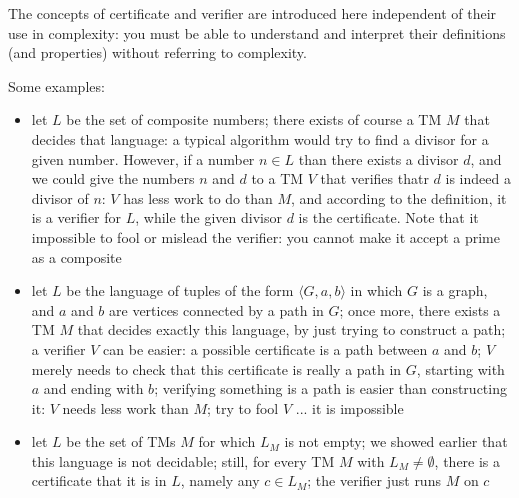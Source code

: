 The concepts of certificate and verifier are introduced here
independent of their use in complexity: you must be able to understand
and interpret their definitions (and properties) without referring to
complexity.



Some examples:
\begin{itemize}
\item 
let $L$ be the set of composite numbers; there exists of course a TM
$M$ that decides that language: a typical algorithm would try to find
a divisor for a given number. However, if a number $n \in L$ than
there exists a divisor $d$, and we could give the numbers $n$ and $d$
to a TM $V$ that verifies thatr $d$ is indeed a divisor of $n$: $V$
has less work to do than $M$, and according to the definition, it is a
verifier for $L$, while the given divisor $d$ is the certificate. Note
that it impossible to fool or mislead the verifier: you cannot make it
accept a prime as a composite

\item 
let $L$ be the language of tuples of the form $\langle G,a,b \rangle$
in which $G$ is a graph, and $a$ and $b$ are vertices connected by a
path in $G$; once more, there exists a TM $M$ that decides exactly
this language, by just trying to construct a path; a verifier $V$ can
be easier: a possible certificate is a path between $a$ and $b$; $V$
merely needs to check that this certificate is really a path in $G$,
starting with $a$ and ending with $b$; verifying something is a path
is easier than constructing it: $V$ needs less work than $M$; try to
fool $V$ ... it is impossible

\item
let $L$ be the set of TMs $M$ for which $L_M$ is not empty; we showed
earlier that this language is not decidable; still, for every TM $M$
with $L_M \neq \emptyset$, there is a certificate that it is in $L$,
namely any $c \in L_M$; the verifier just runs $M$ on $c$

\end{itemize}

